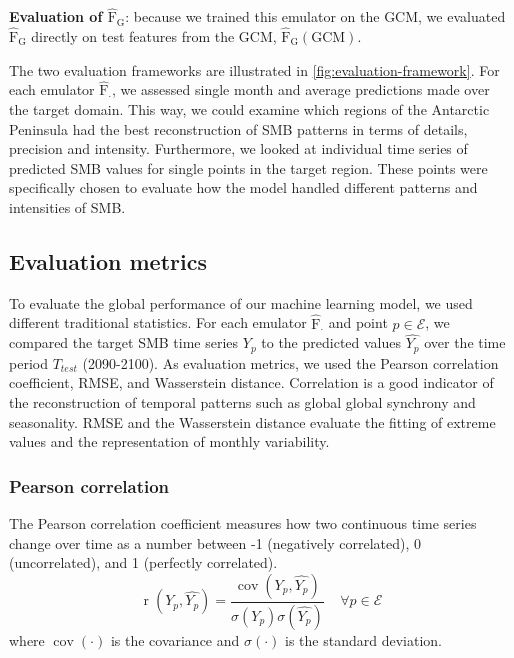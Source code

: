 \documentclass[a4paper,11pt,oneside]{report}
\begin{document}
\textbf{Evaluation of $\mathrm{\hat{F}_G}$}: because we trained this emulator on the GCM, we evaluated $\mathrm{\hat{F}_G}$ directly on test features from the GCM, $\mathrm{\hat{F}_G(GCM)}$.

The two evaluation frameworks are illustrated in \autoref{fig:evaluation-framework}. For each emulator $\mathrm{\hat{F}_{\cdot}}$, we assessed single month and average predictions made over the target domain. This way, we could examine which regions of the Antarctic Peninsula had the best reconstruction of SMB patterns in terms of details, precision and intensity. Furthermore, we looked at individual time series of predicted SMB values for single points in the target region. These points were specifically chosen to evaluate how the model handled different patterns and intensities of SMB.  

\subsection{Evaluation metrics}\label{subsec:evaluation-metrics} 

To evaluate the global performance of our machine learning model, we used different traditional statistics. For each emulator $\mathrm{\hat{F}_{\cdot}}$ and point $p \in \mathcal{E}$, we compared the target SMB time series $Y_{p}$ to the predicted values $\widehat{Y_{p}}$ over the time period $T_{test}$ (2090-2100). As evaluation metrics, we used the Pearson correlation coefficient, RMSE, and Wasserstein distance. Correlation is a good indicator of the reconstruction of temporal patterns such as global global synchrony and seasonality. RMSE and the Wasserstein distance evaluate the fitting of extreme values and the representation of monthly variability. 

\subsubsection{Pearson correlation}\label{subsubsec:pearson-corr}
The Pearson correlation coefficient measures how two continuous time series change over time as a number between -1 (negatively correlated), 0 (uncorrelated), and 1 (perfectly correlated).
\begin{equation}
    \operatorname{r}\left(Y_{p},\widehat{Y_{p}}\right) = \frac{\operatorname{cov}(Y_{p},\widehat{Y_{p}})}{\sigma(Y_{p})\sigma(\widehat{Y_{p}})} \;\;\;\; \forall p \in \mathcal{E} 
\end{equation}
where $\operatorname {cov}(\cdot)$  is the covariance and  $\sigma(\cdot)$ is the standard deviation.
\end{document}
